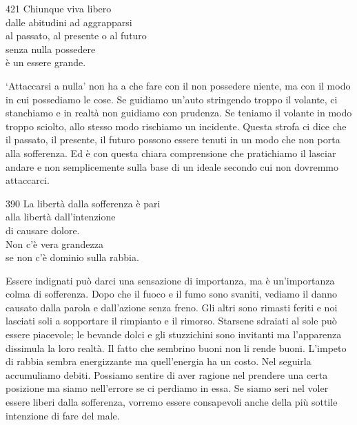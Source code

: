 
\begin{dhpVerse}{421}
\label{dhp-421}
Chiunque viva libero\\
dalle abitudini ad aggrapparsi\\
al passato, al presente o al futuro\\
senza nulla possedere\\
\`{e} un essere grande.
\end{dhpVerse}

\begin{dhpRefl}
`Attaccarsi a nulla' non ha a che fare con il non possedere niente, ma con il modo in cui possediamo le cose. Se guidiamo un'auto stringendo troppo il volante, ci stanchiamo e in realt\`{a} non guidiamo con prudenza. Se teniamo il volante in modo troppo sciolto, allo stesso modo rischiamo un incidente. Questa strofa ci dice che il passato, il presente, il futuro possono essere tenuti in un modo che non porta alla sofferenza. Ed \`{e} con questa chiara comprensione che pratichiamo il lasciar andare e non semplicemente sulla base di un ideale secondo cui non dovremmo attaccarci.
\end{dhpRefl}


\begin{dhpVerse}{390}
\label{dhp-390}
La libert\`{a} dalla sofferenza \`{e} pari\\
alla libert\`{a} dall'intenzione\\
di causare dolore.\\Non c'\`{e} vera grandezza\\
se non c'\`{e} dominio sulla rabbia.
\end{dhpVerse}

\begin{dhpRefl}
Essere indignati pu\`{o} darci una sensazione di importanza, ma \`{e} un'importanza colma di sofferenza. Dopo che il fuoco e il fumo sono svaniti, vediamo il danno causato dalla parola e dall'azione senza freno. Gli altri sono rimasti feriti e noi lasciati soli a sopportare il rimpianto e il rimorso. Starsene sdraiati al sole pu\`{o} essere piacevole; le bevande dolci e gli stuzzichini sono invitanti ma l'apparenza dissimula la loro realt\`{a}. Il fatto che sembrino buoni non li rende buoni. L'impeto di rabbia sembra energizzante ma quell'energia ha un costo. Nel seguirla accumuliamo debiti. Possiamo sentire di aver ragione nel prendere una certa posizione ma siamo nell'errore se ci perdiamo in essa. Se siamo seri nel voler essere liberi dalla sofferenza, vorremo essere consapevoli anche della più sottile intenzione di fare del male.
\end{dhpRefl}

